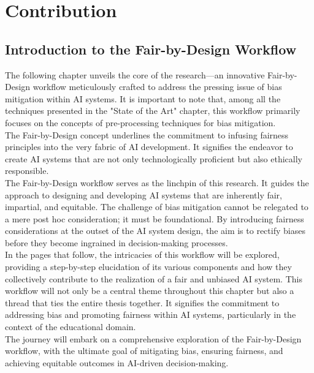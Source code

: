 \documentclass[12pt,a4paper,openright,twoside]{book}
\begin{document}
%

\chapter{Contribution} %
\label{chap:contibution}
\section{Introduction to the Fair-by-Design Workflow}
The following chapter unveils the core of the research—an innovative Fair-by-Design workflow meticulously crafted to address the pressing issue of bias mitigation within AI systems. It is important to note that, among all the techniques presented in the "State of the Art" chapter, this workflow primarily focuses on the concepts of pre-processing techniques for bias mitigation. \\
The Fair-by-Design concept underlines the commitment to infusing fairness principles into the very fabric of AI development. It signifies the endeavor to create AI systems that are not only technologically proficient but also ethically responsible. \\
The Fair-by-Design workflow serves as the linchpin of this research. It guides the approach to designing and developing AI systems that are inherently fair, impartial, and equitable. The challenge of bias mitigation cannot be relegated to a mere post hoc consideration; it must be foundational. By introducing fairness considerations at the outset of the AI system design, the aim is to rectify biases before they become ingrained in decision-making processes. \\
In the pages that follow, the intricacies of this workflow will be explored, providing a step-by-step elucidation of its various components and how they collectively contribute to the realization of a fair and unbiased AI system. This workflow will not only be a central theme throughout this chapter but also a thread that ties the entire thesis together. It signifies the commitment to addressing bias and promoting fairness within AI systems, particularly in the context of the educational domain. \\
The journey will embark on a comprehensive exploration of the Fair-by-Design workflow, with the ultimate goal of mitigating bias, ensuring fairness, and achieving equitable outcomes in AI-driven decision-making.
\end{document}
